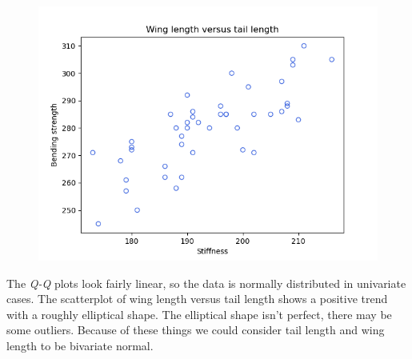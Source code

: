 \begin{enumerate}[label= (\alph*)]
    \begin{figure}[H]
        \centering
        \includegraphics[scale=0.55]{./python/chapter-5/Question-5-20-c-xy.png}
    \end{figure}

    The \textit{Q-Q} plots look fairly linear, so the data is normally distributed in univariate cases. The scatterplot of wing length versus tail length shows a positive trend with a roughly elliptical shape. The elliptical shape isn't perfect, there may be some outliers. Because of these things we could consider tail length and wing length to be bivariate normal. 

\end{enumerate}